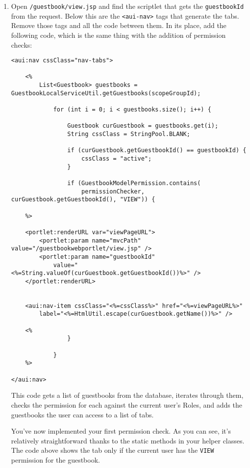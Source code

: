 \begin{enumerate}
\def\labelenumi{\arabic{enumi}.}
\item
  Open \texttt{/guestbook/view.jsp} and find the scriptlet that gets the
  \texttt{guestbookId} from the request. Below this are the
  \texttt{\textless{}aui-nav\textgreater{}} tags that generate the tabs.
  Remove those tags and all the code between them. In its place, add the
  following code, which is the same thing with the addition of
  permission checks:

\begin{verbatim}
<aui:nav cssClass="nav-tabs">

    <%
        List<Guestbook> guestbooks = GuestbookLocalServiceUtil.getGuestbooks(scopeGroupId);

            for (int i = 0; i < guestbooks.size(); i++) {

                Guestbook curGuestbook = guestbooks.get(i);
                String cssClass = StringPool.BLANK;

                if (curGuestbook.getGuestbookId() == guestbookId) {
                    cssClass = "active";
                }

                if (GuestbookModelPermission.contains(
                    permissionChecker, curGuestbook.getGuestbookId(), "VIEW")) {

    %>

    <portlet:renderURL var="viewPageURL">
        <portlet:param name="mvcPath" value="/guestbookwebportlet/view.jsp" />
        <portlet:param name="guestbookId"
            value="<%=String.valueOf(curGuestbook.getGuestbookId())%>" />
    </portlet:renderURL>


    <aui:nav-item cssClass="<%=cssClass%>" href="<%=viewPageURL%>"
        label="<%=HtmlUtil.escape(curGuestbook.getName())%>" />

    <%  
                }

            }
    %>

</aui:nav>
\end{verbatim}

  This code gets a list of guestbooks from the database, iterates
  through them, checks the permission for each against the current
  user's Roles, and adds the guestbooks the user can access to a list of
  tabs.

  You've now implemented your first permission check. As you can see,
  it's relatively straightforward thanks to the static methods in your
  helper classes. The code above shows the tab only if the current user
  has the \texttt{VIEW} permission for the guestbook.


\end{enumerate}
